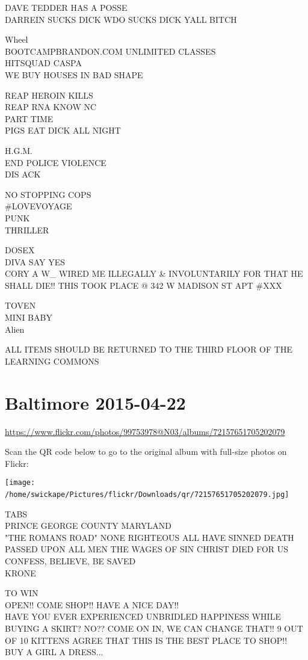 \documentclass[10pt,letterpaper]{article}
\begin{document}
DAVE TEDDER HAS A POSSE\\
DARREIN SUCKS DICK WDO SUCKS DICK YALL BITCH

Wheel\\
BOOTCAMPBRANDON.COM UNLIMITED CLASSES\\
HITSQUAD CASPA\\
WE BUY HOUSES IN BAD SHAPE

REAP HEROIN KILLS\\
REAP RNA KNOW NC\\
PART TIME\\
PIGS EAT DICK ALL NIGHT

H.G.M.\\
END POLICE VIOLENCE\\
DIS ACK

NO STOPPING COPS\\
\#LOVEVOYAGE\\
PUNK\\
THRILLER

DOSEX\\
DIVA SAY YES\\
CORY A W\_ WIRED ME ILLEGALLY \& INVOLUNTARILY FOR THAT HE SHALL DIE!! THIS TOOK PLACE @ 342 W MADISON ST APT \#XXX

TOVEN\\
MINI BABY\\
Alien

ALL ITEMS SHOULD BE RETURNED TO THE THIRD FLOOR OF THE LEARNING COMMONS
\

\section*{Baltimore 2015-04-22}

\url{https://www.flickr.com/photos/99753978@N03/albums/72157651705202079}

Scan the QR code below to go to the original album with full-size photos on Flickr:

\texttt{[image: /home/swickape/Pictures/flickr/Downloads/qr/72157651705202079.jpg]}
\

TABS\\
PRINCE GEORGE COUNTY MARYLAND\\
"THE ROMANS ROAD" NONE RIGHTEOUS ALL HAVE SINNED DEATH PASSED UPON ALL MEN THE WAGES OF SIN CHRIST DIED FOR US CONFESS, BELIEVE, BE SAVED\\
KRONE

TO WIN\\
OPEN!!  COME SHOP!!  HAVE A NICE DAY!!\\
HAVE YOU EVER EXPERIENCED UNBRIDLED HAPPINESS WHILE BUYING A SKIRT?  NO??  COME ON IN, WE CAN CHANGE THAT!!  9 OUT OF 10 KITTENS AGREE THAT THIS IS THE BEST PLACE TO SHOP!!\\
BUY A GIRL A DRESS...
\end{document}
